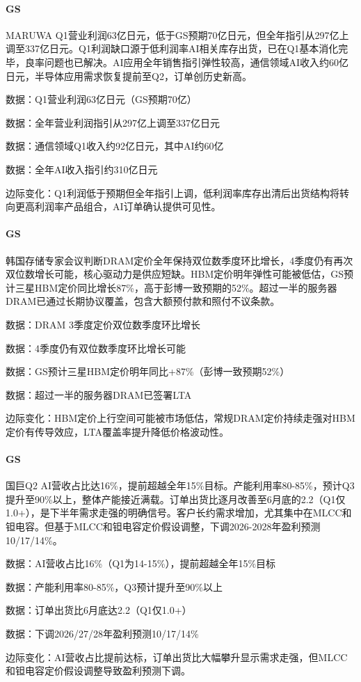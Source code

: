 \documentclass[11pt]{ctexart}
\begin{document}
\paragraph{GS} MARUWA Q1营业利润63亿日元，低于GS预期70亿日元，但全年指引从297亿上调至337亿日元。Q1利润缺口源于低利润率AI相关库存出货，已在Q1基本消化完毕，良率问题也已解决。AI应用全年销售指引弹性较高，通信领域AI收入约60亿日元，半导体应用需求恢复提前至Q2，订单创历史新高。
{\small\color{refgray}数据：Q1营业利润63亿日元（GS预期70亿）\par}
{\small\color{refgray}数据：全年营业利润指引从297亿上调至337亿日元\par}
{\small\color{refgray}数据：通信领域Q1收入约92亿日元，其中AI约60亿\par}
{\small\color{refgray}数据：全年AI收入指引约310亿日元\par}
{\small\color{refgray}边际变化：Q1利润低于预期但全年指引上调，低利润率库存出清后出货结构将转向更高利润率产品组合，AI订单确认提供可见性。\par}
\paragraph{GS} 韩国存储专家会议判断DRAM定价全年保持双位数季度环比增长，4季度仍有再次双位数增长可能，核心驱动力是供应短缺。HBM定价明年弹性可能被低估，GS预计三星HBM定价同比增长87\%，高于彭博一致预期的52\%。超过一半的服务器DRAM已通过长期协议覆盖，包含大额预付款和照付不议条款。
{\small\color{refgray}数据：DRAM 3季度定价双位数季度环比增长\par}
{\small\color{refgray}数据：4季度仍有双位数季度环比增长可能\par}
{\small\color{refgray}数据：GS预计三星HBM定价明年同比+87\%（彭博一致预期52\%）\par}
{\small\color{refgray}数据：超过一半的服务器DRAM已签署LTA\par}
{\small\color{refgray}边际变化：HBM定价上行空间可能被市场低估，常规DRAM定价持续走强对HBM定价有传导效应，LTA覆盖率提升降低价格波动性。\par}
\paragraph{GS} 国巨Q2 AI营收占比达16\%，提前超越全年15\%目标。产能利用率80-85\%，预计Q3提升至90\%以上，整体产能接近满载。订单出货比逐月改善至6月底的2.2（Q1仅1.0+），是下半年需求走强的明确信号。客户长约需求增加，尤其集中在MLCC和钽电容。但基于MLCC和钽电容定价假设调整，下调2026-2028年盈利预测10/17/14\%。
{\small\color{refgray}数据：AI营收占比16\%（Q1为14-15\%），提前超越全年15\%目标\par}
{\small\color{refgray}数据：产能利用率80-85\%，Q3预计提升至90\%以上\par}
{\small\color{refgray}数据：订单出货比6月底达2.2（Q1仅1.0+）\par}
{\small\color{refgray}数据：下调2026/27/28年盈利预测10/17/14\%\par}
{\small\color{refgray}边际变化：AI营收占比提前达标，订单出货比大幅攀升显示需求走强，但MLCC和钽电容定价假设调整导致盈利预测下调。\par}
\end{document}
